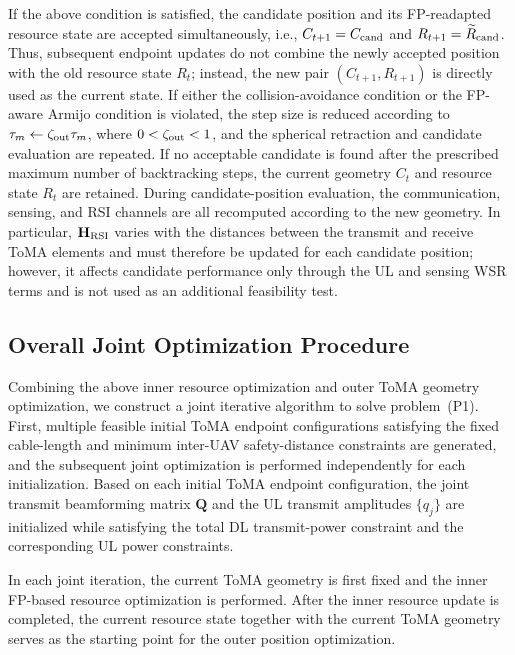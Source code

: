 \documentclass[letterpaper,journal]{IEEEtran}
\begin{document}
If the above condition is satisfied, the candidate position and its FP-readapted resource state are accepted simultaneously, i.e., $C_{t+1}=C_{\rm cand}$ and $R_{t+1}=\widetilde R_{\rm cand}$. Thus, subsequent endpoint updates do not combine the newly accepted position with the old resource state $R_t$; instead, the new pair $(C_{t+1},R_{t+1})$ is directly used as the current state. If either the collision-avoidance condition or the FP-aware Armijo condition is violated, the step size is reduced according to $\tau_m\leftarrow\zeta_{\rm out}\tau_m$, where $0<\zeta_{\rm out}<1$, and the spherical retraction and candidate evaluation are repeated. If no acceptable candidate is found after the prescribed maximum number of backtracking steps, the current geometry $C_t$ and resource state $R_t$ are retained. During candidate-position evaluation, the communication, sensing, and RSI channels are all recomputed according to the new geometry. In particular, $\mathbf H_{\rm RSI}$ varies with the distances between the transmit and receive ToMA elements and must therefore be updated for each candidate position; however, it affects candidate performance only through the UL and sensing WSR terms and is not used as an additional feasibility test.

\subsection{Overall Joint Optimization Procedure}
\label{subsec:overall_algorithm}

Combining the above inner resource optimization and outer ToMA geometry optimization, we construct a joint iterative algorithm to solve problem~(P1). First, multiple feasible initial ToMA endpoint configurations satisfying the fixed cable-length and minimum inter-UAV safety-distance constraints are generated, and the subsequent joint optimization is performed independently for each initialization. Based on each initial ToMA endpoint configuration, the joint transmit beamforming matrix $\mathbf Q$ and the UL transmit amplitudes $\{q_j\}$ are initialized while satisfying the total DL transmit-power constraint and the corresponding UL power constraints.

In each joint iteration, the current ToMA geometry is first fixed and the inner FP-based resource optimization is performed. After the inner resource update is completed, the current resource state together with the current ToMA geometry serves as the starting point for the outer position optimization.
\end{document}
